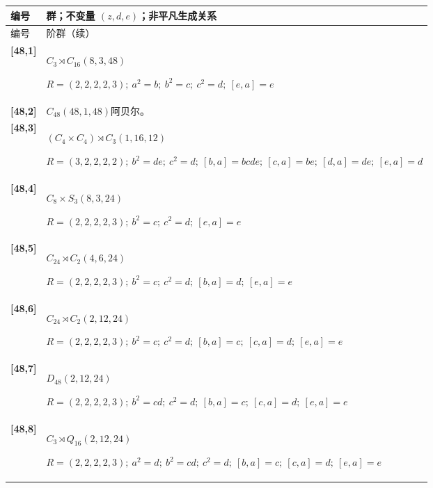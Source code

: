 \documentclass[UTF8,fontset=fandol,11pt,a4paper]{ctexart}
\begin{document}
\begin{longtable}{@{}p{17mm}>{\raggedright\arraybackslash}p{141mm}@{}}

\toprule 编号 & 群；不变量 $(z,d,e)$；非平凡生成关系\\\midrule\endfirsthead

\toprule 编号 & 48 阶群（续）\\\midrule\endhead\bottomrule\endfoot

\textbf{[48,1]} & $C_{3}\rtimes C_{16}$\quad $(8,3,48)$\par\(R=(2,2,2,2,3);\allowbreak\ a^{2}=b;\allowbreak\ b^{2}=c;\allowbreak\ c^{2}=d;\allowbreak\ [e,a]=e\)\\[3pt]

\textbf{[48,2]} & $C_{48}$\quad $(48,1,48)$\quad 阿贝尔。\\[3pt]

\textbf{[48,3]} & $(C_{4}\times C_{4})\rtimes C_{3}$\quad $(1,16,12)$\par\(R=(3,2,2,2,2);\allowbreak\ b^{2}=de;\allowbreak\ c^{2}=d;\allowbreak\ [b,a]=bcde;\allowbreak\ [c,a]=be;\allowbreak\ [d,a]=de;\allowbreak\ [e,a]=d\)\\[3pt]

\textbf{[48,4]} & $C_{8}\times S_{3}$\quad $(8,3,24)$\par\(R=(2,2,2,2,3);\allowbreak\ b^{2}=c;\allowbreak\ c^{2}=d;\allowbreak\ [e,a]=e\)\\[3pt]

\textbf{[48,5]} & $C_{24}\rtimes C_{2}$\quad $(4,6,24)$\par\(R=(2,2,2,2,3);\allowbreak\ b^{2}=c;\allowbreak\ c^{2}=d;\allowbreak\ [b,a]=d;\allowbreak\ [e,a]=e\)\\[3pt]

\textbf{[48,6]} & $C_{24}\rtimes C_{2}$\quad $(2,12,24)$\par\(R=(2,2,2,2,3);\allowbreak\ b^{2}=c;\allowbreak\ c^{2}=d;\allowbreak\ [b,a]=c;\allowbreak\ [c,a]=d;\allowbreak\ [e,a]=e\)\\[3pt]

\textbf{[48,7]} & $D_{48}$\quad $(2,12,24)$\par\(R=(2,2,2,2,3);\allowbreak\ b^{2}=cd;\allowbreak\ c^{2}=d;\allowbreak\ [b,a]=c;\allowbreak\ [c,a]=d;\allowbreak\ [e,a]=e\)\\[3pt]

\textbf{[48,8]} & $C_{3}\rtimes Q_{16}$\quad $(2,12,24)$\par\(R=(2,2,2,2,3);\allowbreak\ a^{2}=d;\allowbreak\ b^{2}=cd;\allowbreak\ c^{2}=d;\allowbreak\ [b,a]=c;\allowbreak\ [c,a]=d;\allowbreak\ [e,a]=e\)\\[3pt]


\end{longtable}
\end{document}
